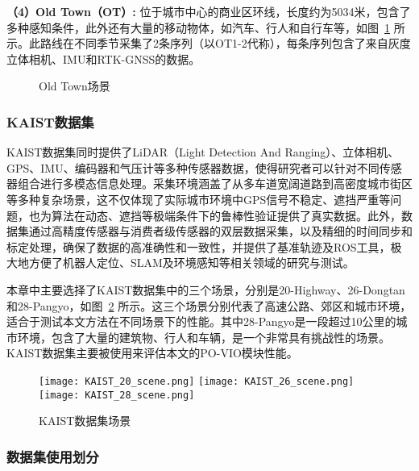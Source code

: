 \textbf{（4）Old Town（OT）:} 位于城市中心的商业区环线，长度约为5034米，包含了多种感知条件，此外还有大量的移动物体，如汽车、行人和自行车等，如图~\ref{fig:OT_data} 所示。此路线在不同季节采集了2条序列（以OT1-2代称），每条序列包含了来自灰度立体相机、IMU和RTK-GNSS的数据。

\begin{figure}
  \centering
  \caption{Old Town场景}
  \label{fig:OT_data}
\end{figure}

\subsubsection{KAIST数据集}
KAIST数据集\cite{jjeong-2019-ijrr}同时提供了LiDAR（Light Detection And Ranging）、立体相机、GPS、IMU、编码器和气压计等多种传感器数据，使得研究者可以针对不同传感器组合进行多模态信息处理。采集环境涵盖了从多车道宽阔道路到高密度城市街区等多种复杂场景，这不仅体现了实际城市环境中GPS信号不稳定、遮挡严重等问题，也为算法在动态、遮挡等极端条件下的鲁棒性验证提供了真实数据。此外，数据集通过高精度传感器与消费者级传感器的双层数据采集，以及精细的时间同步和标定处理，确保了数据的高准确性和一致性，并提供了基准轨迹及ROS工具，极大地方便了机器人定位、SLAM及环境感知等相关领域的研究与测试。

本章中主要选择了KAIST数据集中的三个场景，分别是20-Highway、26-Dongtan和28-Pangyo，如图~\ref{fig:KAIST_data} 所示。这三个场景分别代表了高速公路、郊区和城市环境，适合于测试本文方法在不同场景下的性能。其中28-Pangyo是一段超过10公里的城市环境，包含了大量的建筑物、行人和车辆，是一个非常具有挑战性的场景。KAIST数据集主要被使用来评估本文的PO-VIO模块性能。

\begin{figure}
  \centering
  \texttt{[image: KAIST\_20\_scene.png]}
  \texttt{[image: KAIST\_26\_scene.png]}
  \texttt{[image: KAIST\_28\_scene.png]}
  \caption{KAIST数据集场景}
  \label{fig:KAIST_data}
\end{figure}

\subsubsection{数据集使用划分}

